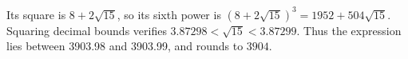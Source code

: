 Its square is $8+2\sqrt{15}$, so its sixth power is $(8+2\sqrt{15})^3=1952+504\sqrt{15}$. Squaring decimal bounds verifies $3.87298<\sqrt{15}<3.87299$. Thus the expression lies between 3903.98 and 3903.99, and rounds to $\boxed{3904}$.
